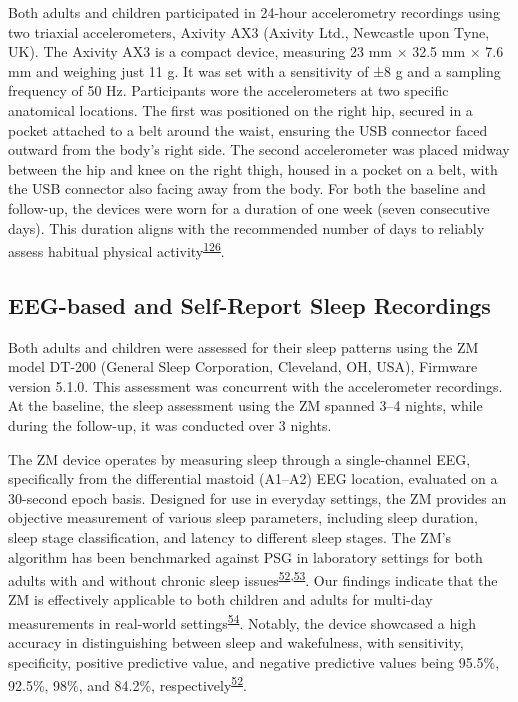 \documentclass[
  10pt,
]{scrbook}
\begin{document}
Both adults and children participated in 24-hour accelerometry
recordings using two triaxial accelerometers, Axivity AX3 (Axivity Ltd.,
Newcastle upon Tyne, UK). The Axivity AX3 is a compact device, measuring
23 mm × 32.5 mm × 7.6 mm and weighing just 11 g. It was set with a
sensitivity of ±8 g and a sampling frequency of 50 Hz. Participants wore
the accelerometers at two specific anatomical locations. The first was
positioned on the right hip, secured in a pocket attached to a belt
around the waist, ensuring the USB connector faced outward from the
body's right side. The second accelerometer was placed midway between
the hip and knee on the right thigh, housed in a pocket on a belt, with
the USB connector also facing away from the body. For both the baseline
and follow-up, the devices were worn for a duration of one week (seven
consecutive days). This duration aligns with the recommended number of
days to reliably assess habitual physical
activity\textsuperscript{\protect\hyperlink{ref-jaeschke_variability_2018}{126}}.

\hypertarget{eeg-based-and-self-report-sleep-recordings}{%
\subsection{EEG-based and Self-Report Sleep
Recordings}\label{eeg-based-and-self-report-sleep-recordings}}

Both adults and children were assessed for their sleep patterns using
the ZM model DT-200 (General Sleep Corporation, Cleveland, OH, USA),
Firmware version 5.1.0. This assessment was concurrent with the
accelerometer recordings. At the baseline, the sleep assessment using
the ZM spanned 3--4 nights, while during the follow-up, it was conducted
over 3 nights.

The ZM device operates by measuring sleep through a single-channel EEG,
specifically from the differential mastoid (A1--A2) EEG location,
evaluated on a 30-second epoch basis. Designed for use in everyday
settings, the ZM provides an objective measurement of various sleep
parameters, including sleep duration, sleep stage classification, and
latency to different sleep stages. The ZM's algorithm has been
benchmarked against PSG in laboratory settings for both adults with and
without chronic sleep
issues\textsuperscript{\protect\hyperlink{ref-kaplan_performance_2014}{52},\protect\hyperlink{ref-wang_evaluation_2015}{53}}.
Our findings indicate that the ZM is effectively applicable to both
children and adults for multi-day measurements in real-world
settings\textsuperscript{\protect\hyperlink{ref-pedersen_self-administered_2021}{54}}.
Notably, the device showcased a high accuracy in distinguishing between
sleep and wakefulness, with sensitivity, specificity, positive
predictive value, and negative predictive values being 95.5\%, 92.5\%,
98\%, and 84.2\%,
respectively\textsuperscript{\protect\hyperlink{ref-kaplan_performance_2014}{52}}.
\end{document}

